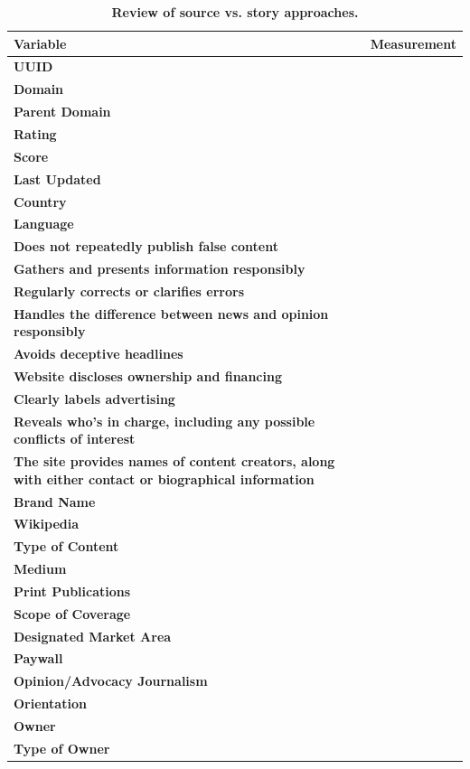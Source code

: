 \begin{table}[H]
\centering
\caption{\textbf{Review of source vs. story approaches.}}
\label{table:table1}
\begin{tabularx}{\textwidth}{ | X | c | }
\toprule
\textbf{Variable} &  \textbf{Measurement} \\
\midrule
\textbf{UUID} &  \\
 \hline
\textbf{Domain}    &     \\
\textbf{Parent Domain} &    \\
\textbf{Rating} &    \\
\textbf{Score} &    \\
\textbf{Last Updated} &  \\
\textbf{Country} &    \\
\textbf{Language} &    \\
\textbf{Does not repeatedly publish false content} & \\
\textbf{Gathers and presents information responsibly} & \\
\textbf{Regularly corrects or clarifies errors} & \\
\textbf{Handles the difference between news and opinion responsibly} & \\
\textbf{Avoids deceptive headlines} & \\
\textbf{Website discloses ownership and financing} & \\
\textbf{Clearly labels advertising} & \\
\textbf{Reveals who's in charge, including any possible conflicts of interest} & \\
\textbf{The site provides names of content creators, along with either contact or biographical information} & \\
\textbf{Brand Name} & \\
\textbf{Wikipedia} & \\
\textbf{Type of Content} & \\
\textbf{Medium} & \\
\textbf{Print Publications} & \\
\textbf{Scope of Coverage} & \\
\textbf{Designated Market Area} & \\
\textbf{Paywall} & \\
\textbf{Opinion/Advocacy Journalism} & \\
\textbf{Orientation} & \\
\textbf{Owner} & \\
\textbf{Type of Owner} & \\

\end{tabularx}
\end{table}
